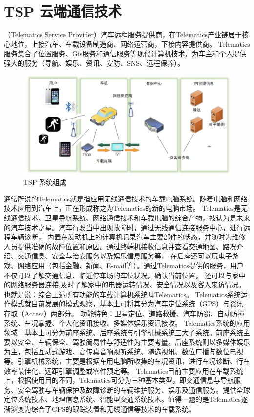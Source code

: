 \section*{TSP 云端通信技术}

（Telematics Service Provider）汽车远程服务提供商，在Telematics产业链居于核心地位，上接汽车、车载设备制造商、网络运营商，下接内容提供商。
 Telematics服务集合了位置服务、Gis服务和通信服务等现代计算机技术，为车主和个人提供强大的服务（导航、娱乐、资讯、安防、SNS、远程保养）。
 \begin{figure}
    \centering
    \includegraphics[scale=0.6]{resources/img/i2.png}
    \caption{TSP 系统组成}
  \end{figure}
\newline
通常所说的Telematics就是指应用无线通信技术的车载电脑系统。随着电脑和网络技术应用到汽车上，正在形成称之为Telematics的新的电脑市场。
Telematics是无线通信技术、卫星导航系统、网络通信技术和车载电脑的综合产物，被认为是未来的汽车技术之星。汽车行驶当中出现故障时，通过无线通信连接服务中心，进行远程车辆诊断，
内置在发动机上的计算机记录汽车主要部件的状态，并随时为维修人员提供准确的故障位置和原因。通过终端机接收信息并查看交通地图、路况介绍、交通信息、安全与治安服务以及娱乐信息服务等，
在后座还可以玩电子游戏、网络应用（包括金融、新闻、E-mail等）。通过Telematics提供的服务，用户不仅可以了解交通信息、临近停车场的车位状况，确认当前位置，
还可以与家中的网络服务器连接,及时了解家中的电器运转情况、安全情况以及客人来访情况。也就是说：综合上述所有功能的车载计算机系统叫Telematics。
Telematics系统运作模式就目前发展的模式观察，基本上可将其分为汽车定位系统（GPS）与资讯存取（Access）两部分。
功能特色：卫星定位、道路救援、汽车防窃、自动防撞系统、车况掌握、个人化资讯接收、多媒体娱乐资讯接收。
\newline
Telematics系统的应用领域：基本上可分为前座系统、后座系统与引擎机械系统三大子系统。前座系统主要以安全、车辆保全、驾驶简易性与舒适性为主要考量。后座系统则以多媒体娱乐为主，包括互动式游戏、高传真音响视听系统、随选视讯、数位广播与数位电视等。引擎机械系统，主要是根据车用电脑所收集的车况资讯，进行车况诊断、行车效率最佳化、远距引擎调整或零件预定等。
\newline
Telematics目前主要应用在车载系统上，根据使用目的不同，Telematics可分为三种基本类型，即交通信息与导航服务、安全驾驶与车辆保护及故障诊断的车辆维护服务、娱乐及通信服务。提供全球定位系统技术、地理信息系统、智能型交通系统技术。值得一题的是Telematics逐渐演变为综合了GPS的跟踪装置和无线通信等技术的车载系统。


